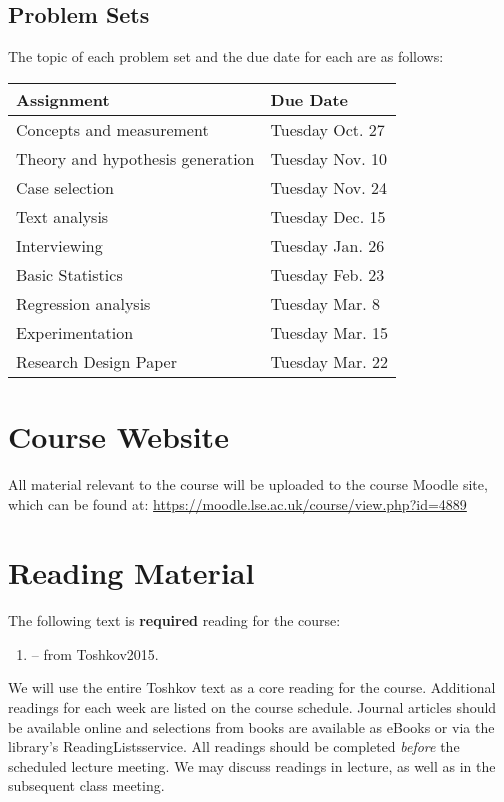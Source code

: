 \documentclass[12pt,a4paper]{article}
\newcommand{\textbook}[2][]{\noindent -- {#1} from #2.\vspace{.25em}\\}
\begin{document}
\subsection{Problem Sets}

The topic of each problem set and the due date for each are as follows:

\begin{center}
\begin{tabular}{ll} \toprule
Assignment & Due Date \\ \midrule
Concepts and measurement & Tuesday Oct. 27 \\
Theory and hypothesis generation & Tuesday Nov. 10 \\
Case selection & Tuesday Nov. 24\\
Text analysis & Tuesday Dec. 15 \\
Interviewing & Tuesday Jan. 26\\
Basic Statistics & Tuesday Feb. 23\\
Regression analysis & Tuesday Mar. 8\\
Experimentation & Tuesday Mar. 15\\ \midrule 
Research Design Paper & Tuesday Mar. 22\\ \bottomrule
\end{tabular}
\end{center}


\section{Course Website}

All material relevant to the course will be uploaded to the course Moodle site, which can be found at: \url{https://moodle.lse.ac.uk/course/view.php?id=4889}


\section{Reading Material}

The following text is \textbf{required} reading for the course:

\begin{enumerate}
\item \textbook{Toshkov2015}
\end{enumerate}

We will use the entire Toshkov text as a core reading for the course. Additional readings for each week are listed on the course schedule. Journal articles should be available online and selections from books are available as eBooks or via the library's ReadingLists\@LSE service. All readings should be completed \textit{before} the scheduled lecture meeting. We may discuss readings in lecture, as well as in the subsequent class meeting.
\end{document}
